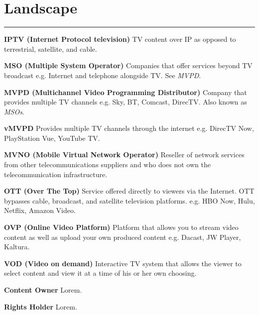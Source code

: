\section{Landscape}
\hrule

\medskip
\textbf{IPTV (Internet Protocol television)}
TV content over IP as opposed to terrestrial, satellite, and cable.

\smallskip
\textbf{MSO (Multiple System Operator)}
Companies that offer services beyond TV broadcast e.g. Internet and telephone alongside TV.  See \textit{MVPD}.

\smallskip
\textbf{MVPD (Multichannel Video Programming Distributor)}
Company that provides multiple TV channels e.g. Sky, BT, Comcast, DirecTV. Also known as \textit{MSOs}.

\smallskip
\textbf{vMVPD}
Provides multiple TV channels through the internet e.g. DirecTV Now, PlayStation Vue, YouTube TV.

\smallskip
\textbf{MVNO (Mobile Virtual Network Operator)}
Reseller of network services from other telecommunications suppliers and who does not own the telecommunication infrastructure.

\smallskip
\textbf{OTT (Over The Top)}
Service offered directly to viewers via the Internet. OTT bypasses cable, broadcast, and satellite television platforms. e.g. HBO Now, Hulu, Netflix, Amazon Video.

\smallskip
\textbf{OVP (Online Video Platform)}
Platform that allows you to stream video content as well as upload your own produced content e.g. Dacast, JW Player, Kaltura.

\smallskip
\textbf{VOD (Video on demand)}
Interactive TV system that allows the viewer to select content and view it at a time of his or her own choosing.

\smallskip
\textbf{Content Owner}
Lorem.

\smallskip
\textbf{Rights Holder}
Lorem.
